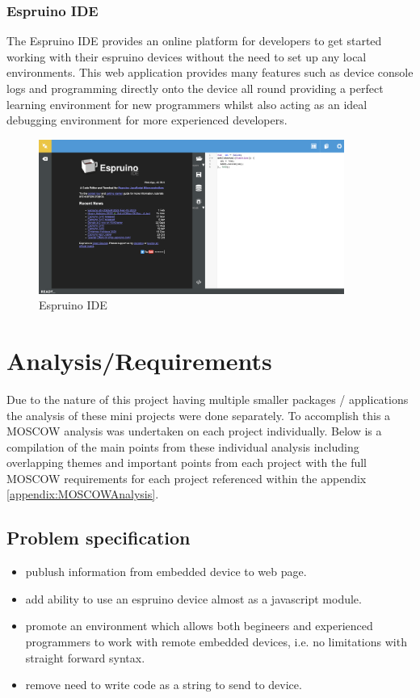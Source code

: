 \documentclass{l4proj}
\begin{document}
\subsection{Espruino IDE}
The Espruino IDE provides an online platform for developers to get started working with their espruino devices without the need to set up any local environments. This web application provides many features such as device console logs and programming directly onto the device all round providing a perfect learning environment for new programmers whilst also acting as an ideal debugging environment for more experienced developers.

\begin{figure}[!ht]
    \centering
    \includegraphics[width=10cm]{dissertation/images/espruino-ide.png}
    \caption{Espruino IDE}
    \label{fig:espruino-ide}
\end{figure}

\chapter{Analysis/Requirements}

\text Due to the nature of this project having multiple smaller packages / applications the analysis of these mini projects were done separately. To accomplish this a MOSCOW analysis was undertaken on each project individually. Below is a compilation of the main points from these individual analysis including overlapping themes and important points from each project with the full MOSCOW requirements for each project referenced within the appendix \ref{appendix:MOSCOWAnalysis}.

\section{Problem specification}

\begin{itemize}
    \item publush information from embedded device to web page.
    \item add ability to use an espruino device almost as a javascript module.
    \item promote an environment which allows both begineers and experienced programmers to work with remote embedded devices, i.e. no limitations with straight forward syntax.
    \item remove need to write code as a string to send to device.
\end{itemize}
\end{document}
